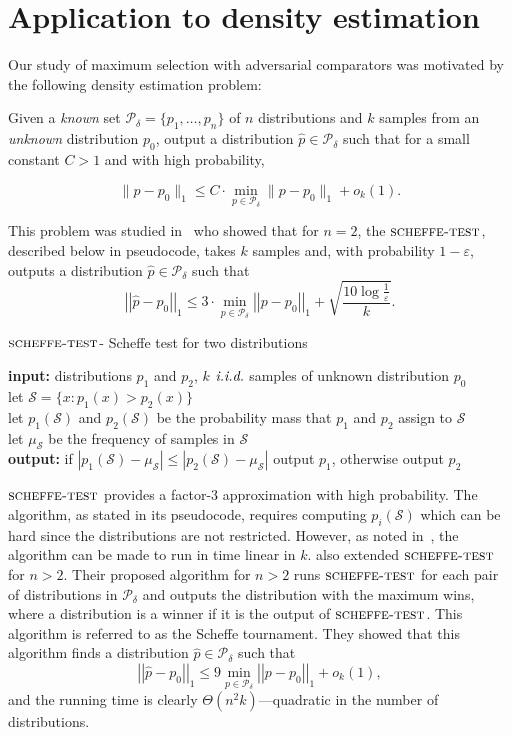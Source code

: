 \documentclass[twoside,11pt]{article}
\newcommand{\iid}{\emph{i.i.d.}\xspace}
\newcommand{\cP}{\mathcal{P}}
\newcommand{\cS}{\mathcal{S}}
\newcommand{\norm}[1]{\left|\left|#1\right|\right|}
\newcommand{\algscheffetest}{\textsc{scheffe-test}}
\newcommand{\deltacover}{\delta}
\newcommand{\errordens}{\varepsilon}
\begin{document}
\section{Application to density estimation}
\label{sec:densityestimation}

Our study of maximum selection with adversarial comparators was
motivated by the following density estimation problem:

Given a \emph{known} set $\cP_{\deltacover}=\{p_1,\ldots,p_n\}$ of $n$
distributions and $k$ samples from an \emph{unknown} distribution
$p_0$, output a distribution $\hat{p} \in \cP_{\deltacover}$ such that
for a small constant $C>1$ and with high probability,

\[
\|\hat{p}-p_0\|_1\le C\cdot \min_{p \in \cP_{\deltacover}} \|p-p_0\|_1+o_k(1).
\]

\noindent This problem was studied in~\citet{DevroyeL01} who showed
that for $n=2$, the $\algscheffetest$, described below in pseudocode, takes
$k$ samples and, with probability $1-\errordens$, outputs a distribution
$\hat{p}\in \cP_{\deltacover}$ such that
 \begin{equation}
 \label{eqn:scheffetest}
  \norm{\hat{p}-p_0}_1 \leq 3 \cdot \min_{p \in \cP_{\deltacover}} \norm{p-p_0}_1 + \sqrt{\frac{10\log \frac{1}{\errordens}}{k}}.
 \end{equation}
\begin{algorithm}
\caption{$\algscheffetest$- Scheffe test for two distributions}
\textbf{input:} distributions $p_1$ and $p_2$, $k$ $\iid$ samples of unknown distribution $p_0$\\
\qquad let $\cS=\{x:p_1(x)>p_2(x)\}$\\
\qquad let $p_1(\cS)$ and $p_2(\cS)$ be the probability mass that $p_1$ and $p_2$ assign to $\cS$\\ 
\qquad let $\mu_\cS$ be the frequency of samples in $\cS$\\

\textbf{output:} if $|p_1(\cS)-\mu_\cS|\le|p_2(\cS)-\mu_\cS|$ output $p_1$, otherwise output $p_2$ 
\end{algorithm}

$\algscheffetest$ provides a factor-$3$ approximation with high
probability.  The algorithm, as stated in its pseudocode, requires
computing $p_i(\cS)$ which can be hard since the distributions are not
restricted.  However, as noted in~\citet{AcharyaJOS14}, the algorithm
can be made to run in time linear in $k$.
\citet{DevroyeL01} also extended $\algscheffetest$ for $n>2$. Their
proposed algorithm for $n>2$ runs $\algscheffetest$ for each pair of
distributions in $\cP_{\deltacover}$ and outputs the distribution with the 
maximum wins, where a distribution is a winner if it is the
output of $\algscheffetest$. This algorithm is referred to as the
Scheffe tournament.  They showed that this algorithm finds a
distribution $\hat{p}\in \cP_{\deltacover}$ such that
\[
 \norm{\hat{p}-p_0}_1\le 9 \min_{p \in \cP_{\deltacover}} \norm{p-p_0}_1+o_k(1), 
\]
and the running time is clearly $\Theta(n^2k)$---quadratic in the number
of distributions. 
\end{document}
